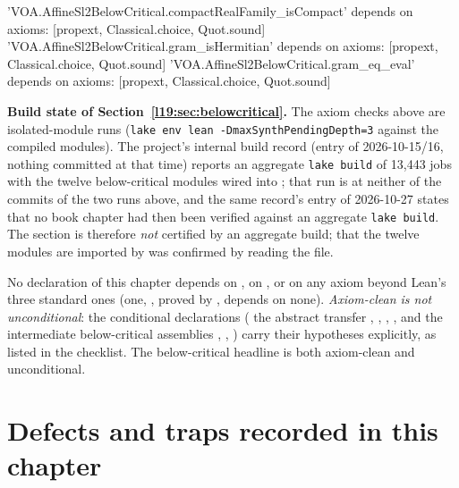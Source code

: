 \begin{plaincode}
'VOA.AffineSl2BelowCritical.compactRealFamily_isCompact' depends on axioms: [propext, Classical.choice, Quot.sound]
'VOA.AffineSl2BelowCritical.gram_isHermitian' depends on axioms: [propext, Classical.choice, Quot.sound]
'VOA.AffineSl2BelowCritical.gram_eq_eval' depends on axioms: [propext, Classical.choice, Quot.sound]
\end{plaincode}

\noindent\textbf{Build state of Section~\ref{l19:sec:belowcritical}.} The axiom checks above are isolated-module runs
(\texttt{lake env lean -DmaxSynthPendingDepth=3} against the compiled modules). The project's internal build record (entry of
2026-10-15/16, nothing committed at that time) reports an aggregate \texttt{lake build} of
13,443 jobs with the twelve below-critical modules wired into ; that run is at neither
of the commits of the two runs above, and the same record's entry of 2026-10-27 states that no book
chapter had then been verified against an aggregate \texttt{lake build}. The section is therefore \emph{not} certified by an
aggregate build; that the twelve modules are imported by  was confirmed by reading the
file.

\noindent No declaration of this chapter depends on , on , or on any axiom beyond
Lean's three standard ones (one, , proved by , depends on none).
\emph{Axiom-clean is not unconditional}: the conditional declarations (%
the abstract transfer \allowbreak{}\allowbreak{},
, \allowbreak{}\allowbreak{}\allowbreak{}\allowbreak{},
\allowbreak{}\allowbreak{}\allowbreak{}, and the intermediate below-critical
assemblies \allowbreak{}\allowbreak{}, , ) carry their
hypotheses explicitly, as listed in the checklist. The below-critical headline
\allowbreak{}\allowbreak{}\allowbreak{} is both axiom-clean and unconditional.

\section{Defects and traps recorded in this chapter}\label{l19:sec:defects}


